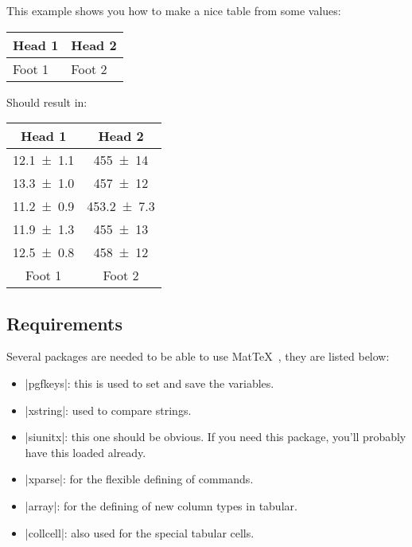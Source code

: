 \documentclass[a4paper,10pt]{article}
\newcommand{\mt}{Mat\TeX\ }
\begin{document}
This example shows you how to make a nice table from some values:
\begin{center}
	\begin{texcode}


		\begin{table}[htp]
			\centering
			\begin{tabular}{MM}
				\hline\header
				Head 1 & Head 2 \noheader \\
				\hline
				\usematrix
				\hline \header
				Foot 1 & Foot 2\\
				\hline
			\end{tabular}
		\end{table}
	\end{texcode}
\end{center}
Should result in:
\begin{table}[h]
	\centering
	\begin{tabular}{cc}
	\hline
	Head 1 & Head 2\\
	\hline
	\SI{12.1+-1.1}{} & \SI{455+-14}{}\\
	\SI{13.3+-1.0}{} & \SI{457+-12}{}\\
	\SI{11.2+-0.9}{} & \SI{453.2+-7.3}{}\\
	\SI{11.9+-1.3}{} & \SI{455+-13}{}\\
	\SI{12.5+-0.8}{} & \SI{458+-12}{}\\
	\hline
	Foot 1 & Foot 2\\
	\hline
	\end{tabular}
\end{table}
\vspace{-1cm}



\subsection{Requirements}
Several packages are needed to be able to use \mt, they are listed below:
\begin{itemize}
	\item |pgfkeys|: this is used to set and save the variables.
	\item |xstring|: used to compare strings.
	\item |siunitx|: this one should be obvious. If you need this package, you'll probably have this loaded already.
	\item |xparse|: for the flexible defining of commands.
	\item |array|: for the defining of new column types in tabular.
	\item |collcell|: also used for the special tabular cells.
\end{itemize}
\end{document}
